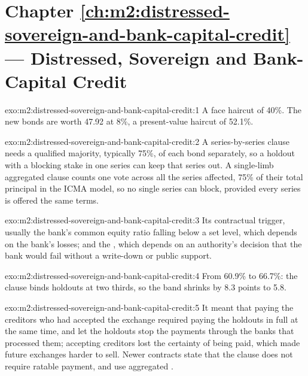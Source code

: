 \section*{Chapter \ref{ch:m2:distressed-sovereign-and-bank-capital-credit} --- Distressed, Sovereign and Bank-Capital Credit}

\begin{solution}{exo:m2:distressed-sovereign-and-bank-capital-credit:1}
A face haircut of 40\%. The new bonds are worth 47.92 at 8\%, a present-value haircut
of 52.1\%.
\end{solution}

\begin{solution}{exo:m2:distressed-sovereign-and-bank-capital-credit:2}
A series-by-series clause needs a qualified majority, typically 75\%, of each bond
separately, so a holdout with a blocking stake in one series can keep that series out.
A single-limb aggregated clause counts one vote across all the series affected, 75\% of
their total principal in the ICMA model, so no single series can block, provided every
series is offered the same terms.
\end{solution}

\begin{solution}{exo:m2:distressed-sovereign-and-bank-capital-credit:3}
Its contractual trigger, usually the bank's common equity ratio falling below a set
level, which depends on the bank's losses; and the , which depends
on an authority's decision that the bank would fail without a write-down or public
support.
\end{solution}

\begin{solution}{exo:m2:distressed-sovereign-and-bank-capital-credit:4}
From 60.9\% to 66.7\%: the clause binds holdouts at two thirds, so the band shrinks by
8.3 points to 5.8.
\end{solution}

\begin{solution}{exo:m2:distressed-sovereign-and-bank-capital-credit:5}
It meant that paying the creditors who had accepted the exchange required paying the
holdouts in full at the same time, and let the holdouts stop the payments through the
banks that processed them; accepting creditors lost the certainty of being paid, which
made future exchanges harder to sell. Newer contracts state that the clause does not
require ratable payment, and use aggregated .
\end{solution}

